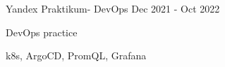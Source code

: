 \begin{cventries}
  \cventry
    {} %
    {Yandex Praktikum- DevOps} %
    {} %
    {Dec 2021 - Oct 2022} %
    {
      \begin{cvitems} %
        \item {DevOps practice}
        \item {k8s, ArgoCD, PromQL, Grafana}
        \end{cvitems}
    }
%
%
\end{cventries}
